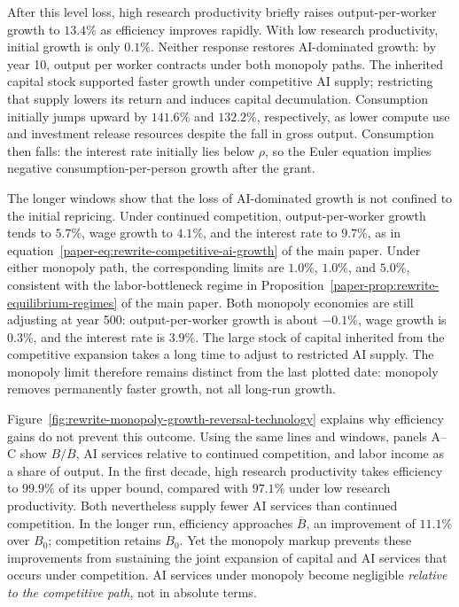 After this level loss, high research productivity briefly raises
output-per-worker growth to $13.4\%$ as efficiency improves rapidly.
With low research productivity, initial growth is only $0.1\%$.
Neither response restores AI-dominated growth: by year 10, output
per worker contracts under both monopoly paths. The inherited capital
stock supported faster growth under competitive AI supply; restricting
that supply lowers its return and induces capital decumulation.
Consumption initially jumps upward by $141.6\%$ and $132.2\%$,
respectively, as lower compute use and investment release resources
despite the fall in gross output. Consumption then falls: the interest
rate initially lies below $\rho$, so the Euler equation implies
negative consumption-per-person growth after the grant.

The longer windows show that the loss of AI-dominated growth is not
confined to the initial repricing.
Under continued competition, output-per-worker growth tends to
$5.7\%$, wage growth to $4.1\%$, and the interest rate to $9.7\%$,
as in equation~\eqref{paper-eq:rewrite-competitive-ai-growth} of the main paper.
Under either monopoly path, the corresponding limits are $1.0\%$,
$1.0\%$, and $5.0\%$, consistent with the labor-bottleneck regime in
Proposition~\ref{paper-prop:rewrite-equilibrium-regimes} of the main paper. Both monopoly
economies are still adjusting at year 500: output-per-worker growth
is about $-0.1\%$, wage growth is $0.3\%$, and the interest rate is
$3.9\%$. The large stock of capital inherited from the competitive
expansion takes a long time to adjust to restricted AI supply. The
monopoly limit therefore remains distinct from the last plotted date:
monopoly removes permanently faster growth, not all long-run growth.

Figure~\ref{fig:rewrite-monopoly-growth-reversal-technology} explains
why efficiency gains do not prevent this outcome. Using the same lines
and windows, panels A--C show $B/\overline B$, AI services relative to
continued competition, and labor income as a share of output.
In the first decade, high research productivity takes efficiency to
$99.9\%$ of its upper bound, compared with $97.1\%$ under low research
productivity. Both nevertheless supply fewer AI services than continued
competition. In the longer run, efficiency approaches
$\overline B$, an improvement of $11.1\%$ over $B_0$; competition
retains $B_0$. Yet the monopoly markup prevents these improvements
from sustaining the joint expansion of capital and AI services that
occurs under competition. AI services under monopoly become negligible
\emph{relative to the competitive path}, not in absolute terms.

